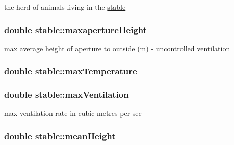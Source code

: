 the herd of animals living in the \hyperlink{classstable}{stable} \hypertarget{classstable_aa652845f1b893896db9077948fec11eb}{
\subsubsection[{maxapertureHeight}]{\setlength{\rightskip}{0pt plus 5cm}double {\bf stable::maxapertureHeight}}}
\label{classstable_aa652845f1b893896db9077948fec11eb}


max average height of aperture to outside (m) -\/ uncontrolled ventilation \hypertarget{classstable_ad7c65b7d1858b8903bd997be80fa773a}{
\subsubsection[{maxTemperature}]{\setlength{\rightskip}{0pt plus 5cm}double {\bf stable::maxTemperature}}}
\label{classstable_ad7c65b7d1858b8903bd997be80fa773a}
\hypertarget{classstable_a57f84982eb9851ab84277c3a823a967d}{
\subsubsection[{maxVentilation}]{\setlength{\rightskip}{0pt plus 5cm}double {\bf stable::maxVentilation}}}
\label{classstable_a57f84982eb9851ab84277c3a823a967d}


max ventilation rate in cubic metres per sec \hypertarget{classstable_a96fc0324c5e4a937b9e41b8545344491}{
\subsubsection[{meanHeight}]{\setlength{\rightskip}{0pt plus 5cm}double {\bf stable::meanHeight}}}
\label{classstable_a96fc0324c5e4a937b9e41b8545344491}


